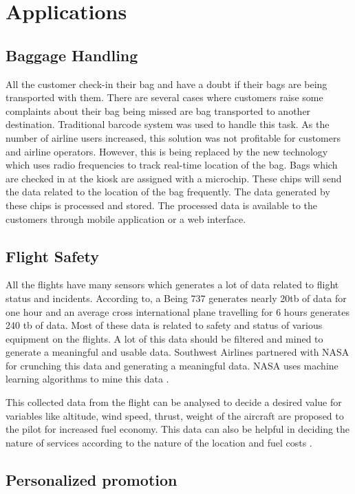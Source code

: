 \documentclass[sigconf]{acmart}
\begin{document}
\section{Applications}

\subsection{Baggage Handling}

All the customer check-in their bag and have a doubt if their bags are being transported with them. There are several cases where customers raise some complaints about their bag being missed are bag transported to another destination. Traditional barcode system was used to handle this task. As the number of airline users increased, this solution was not profitable for customers and airline operators. However, this is being replaced by the new technology which uses radio frequencies to track real-time location of the bag. Bags which are checked in at the kiosk are assigned with a microchip. These chips will send the data related to the location of the bag frequently.  The data generated by these chips is processed and stored. The processed data is available to the customers through mobile application or a web interface\cite{Miller2017}.
\subsection{Flight Safety}


All the flights have many sensors which generates a lot of data related to flight status and incidents. According to, a Being 737 generates nearly 20tb of data for one hour and an average cross international plane travelling for 6 hours generates 240 tb of data.  Most of these data is related to safety and status of various equipment on the flights. A lot of this data should be filtered and mined to generate a meaningful and usable data. Southwest Airlines partnered with NASA for crunching this data and generating a meaningful data. NASA uses machine learning algorithms to mine this data \cite{Smalley2012}. 


This collected data from the flight can be analysed to decide a desired value for variables like altitude, wind speed, thrust, weight of the aircraft are proposed to the pilot for increased fuel economy. This data can also be helpful in deciding the nature of services according to the nature of the location and fuel costs \cite{7889557}.

\subsection{Personalized promotion}
\end{document}
